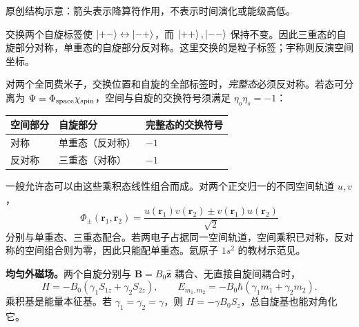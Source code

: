 \begin{center}

{\small 原创结构示意：箭头表示降算符作用，不表示时间演化或能级高低。}
\end{center}

交换两个自旋标签使 $\left|+-\right\rangle\leftrightarrow\left|-+\right\rangle$，而 $\left|++\right\rangle,\left|--\right\rangle$ 保持不变。因此三重态的自旋部分对称，单重态的自旋部分反对称。这里交换的是粒子标签；宇称则反演空间坐标。

对两个全同费米子，交换位置和自旋的全部标签时，\emph{完整态}必须反对称。若态可分离为 $\Psi=\Phi_{\rm space}\chi_{\rm spin}$，空间与自旋的交换符号须满足 $\eta_o\eta_s=-1$：
\begin{center}
\begin{tabular}{@{}lll@{}}
  \toprule
  空间部分 & 自旋部分 & 完整态的交换符号 \\
  \midrule
  对称 & 单重态（反对称） & $-1$ \\
  反对称 & 三重态（对称） & $-1$ \\
  \bottomrule
\end{tabular}
\end{center}
一般允许态可以由这些乘积态线性组合而成。对两个正交归一的不同空间轨道 $u,v$，
\begin{equation}
  \Phi_\pm(\mathbf r_1,\mathbf r_2)
  =\frac{u(\mathbf r_1)v(\mathbf r_2)\pm v(\mathbf r_1)u(\mathbf r_2)}{\sqrt2}
\end{equation}
分别与单重态、三重态配合。若两电子占据同一空间轨道，空间乘积已对称，反对称的空间组合则为零，因此只能配单重态。氦原子 $1s^2$ 的教材示范见。


\textbf{均匀外磁场。}两个自旋分别与 $\mathbf B=B_0\hat{\mathbf z}$ 耦合、无直接自旋间耦合时，
\begin{equation}
  H=-B_0(\gamma_1S_{1z}+\gamma_2S_{2z}),\qquad
  \boxed{E_{m_1,m_2}=-B_0\hbar(\gamma_1m_1+\gamma_2m_2).}
\end{equation}
乘积基是能量本征基。若 $\gamma_1=\gamma_2=\gamma$，则 $H=-\gamma B_0S_z$，总自旋基也能对角化它。

